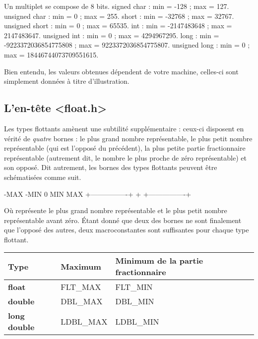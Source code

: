 \begin{C}
Un multiplet se compose de 8 bits.
signed char : min = -128 ; max = 127.
unsigned char : min = 0 ; max = 255.
short : min = -32768 ; max = 32767.
unsigned short : min = 0 ; max = 65535.
int : min = -2147483648 ; max = 2147483647.
unsigned int : min = 0 ; max = 4294967295.
long : min = -9223372036854775808 ; max = 9223372036854775807.
unsigned long : min = 0 ; max = 18446744073709551615.
\end{C}

\begin{infobox} 
Bien entendu, les valeurs obtenues dépendent de votre machine, 
celles-ci sont simplement données à titre d'illustration.
\end{infobox}

\subsection{L'en-tête \textless{}float.h\textgreater{}}
\label{len-tete-float.h}

Les types flottants amènent une subtilité supplémentaire : ceux-ci
disposent en vérité de \emph{quatre} bornes : le plus grand nombre
représentable, le plus petit nombre représentable (qui est l'opposé du
précédent), la plus petite partie fractionnaire représentable (autrement
dit, le nombre le plus proche de zéro représentable) et son opposé. Dit
autrement, les bornes des types flottants peuvent être schématisées
comme suit.

\begin{C}
-MAX             -MIN   0   MIN              MAX
  +----------------+    +    +----------------+
\end{C}

Où  représente le plus grand nombre représentable et
 le plus petit nombre représentable avant zéro. Étant donné
que deux des bornes ne sont finalement que l'opposé des autres, deux
macroconstantes sont suffisantes pour chaque type flottant.

\begin{table}
\centering
{}
\begin{tabular}{|l|l|l|}\hline
\rowcolor{gris-tab-entete}\bf 
Type & Maximum & Minimum de la partie fractionnaire\tabularnewline\hline
\textbf{float} & FLT\_MAX & FLT\_MIN\tabularnewline\hline
\textbf{double} & DBL\_MAX & DBL\_MIN\tabularnewline\hline
\textbf{long double} & LDBL\_MAX & LDBL\_MIN\tabularnewline\hline
\end{tabular}
\end{table}

